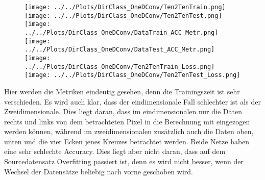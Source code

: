\begin{figure}[htpb]
    \texttt{[image: ../../Plots/DirClass\_OneDConv/Ten2TenTrain.png]}
    \texttt{[image: ../../Plots/DirClass\_OneDConv/Ten2TenTest.png]}
    \texttt{[image: ../../Plots/DirClass\_OneDConv/DataTrain\_ACC\_Metr.png]}
    \texttt{[image: ../../Plots/DirClass\_OneDConv/DataTest\_ACC\_Metr.png]}
    \texttt{[image: ../../Plots/DirClass\_OneDConv/Ten2TenTrain\_Loss.png]}
    \texttt{[image: ../../Plots/DirClass\_OneDConv/Ten2TenTest\_Loss.png]}
    \caption{\label{fig:1dconv}}
\end{figure}

Hier werden die Metriken eindeutig gesehen, denn die Trainingszeit ist sehr verschieden. Es wird auch klar, dass der eindimensionale Fall 
schlechter ist als der Zweidimensionale.
Dies liegt daran, dass im eindimensionalen nur die Daten rechts und links von dem betrachteten Pixel in die Berechnung mit eingezogen werden 
können, während im zweidimensionalen zusätzlich auch die Daten oben, unten und die vier Ecken jenes Kreuzes betrachtet werden.
Beide Netze haben eine sehr schlechte Accuracy. Dies liegt aber nicht daran, dass auf dem Sourcedatensatz Overfitting passiert ist, denn es 
wird nicht besser, wenn der Wechsel der Datensätze beliebig nach vorne geschoben wird.
